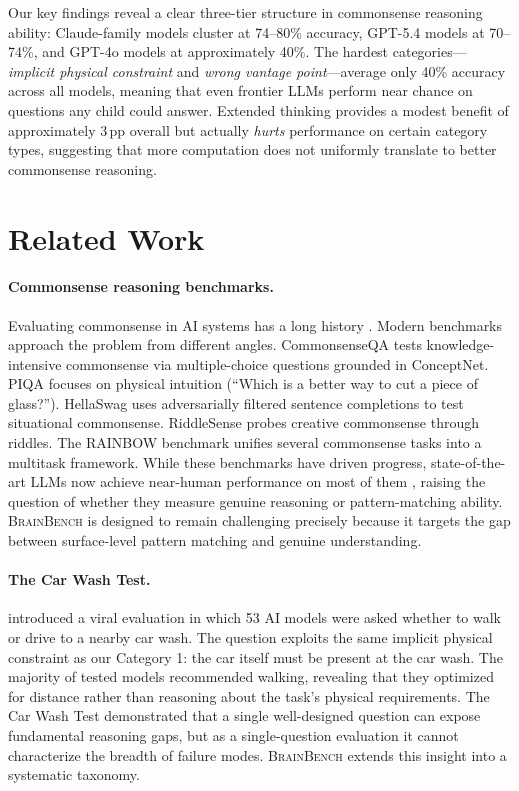 \documentclass[11pt]{article}
\newcommand{\bench}{\textsc{BrainBench}}
\newcommand{\pp}{\,pp}
\begin{document}
Our key findings reveal a clear three-tier structure in commonsense reasoning ability: Claude-family models cluster at 74--80\% accuracy, GPT-5.4 models at 70--74\%, and GPT-4o models at approximately 40\%. The hardest categories---\emph{implicit physical constraint} and \emph{wrong vantage point}---average only 40\% accuracy across all models, meaning that even frontier LLMs perform near chance on questions any child could answer. Extended thinking provides a modest benefit of approximately 3\pp{} overall but actually \emph{hurts} performance on certain category types, suggesting that more computation does not uniformly translate to better commonsense reasoning.

\section{Related Work}
\label{sec:related}

\paragraph{Commonsense reasoning benchmarks.}
Evaluating commonsense in AI systems has a long history \citep{davis2015commonsense}. Modern benchmarks approach the problem from different angles. CommonsenseQA \citep{talmor2019commonsenseqa} tests knowledge-intensive commonsense via multiple-choice questions grounded in ConceptNet. PIQA \citep{bisk2020piqa} focuses on physical intuition (``Which is a better way to cut a piece of glass?''). HellaSwag \citep{zellers2019hellaswag} uses adversarially filtered sentence completions to test situational commonsense. RiddleSense \citep{lin2021riddlesense} probes creative commonsense through riddles. The RAINBOW benchmark \citep{lourie2021unicorn} unifies several commonsense tasks into a multitask framework. While these benchmarks have driven progress, state-of-the-art LLMs now achieve near-human performance on most of them \citep{openai2023gpt4}, raising the question of whether they measure genuine reasoning or pattern-matching ability. \bench{} is designed to remain challenging precisely because it targets the gap between surface-level pattern matching and genuine understanding.

\paragraph{The Car Wash Test.}
\citet{opper2025carwash} introduced a viral evaluation in which 53 AI models were asked whether to walk or drive to a nearby car wash. The question exploits the same implicit physical constraint as our Category 1: the car itself must be present at the car wash. The majority of tested models recommended walking, revealing that they optimized for distance rather than reasoning about the task's physical requirements. The Car Wash Test demonstrated that a single well-designed question can expose fundamental reasoning gaps, but as a single-question evaluation it cannot characterize the breadth of failure modes. \bench{} extends this insight into a systematic taxonomy.
\end{document}
